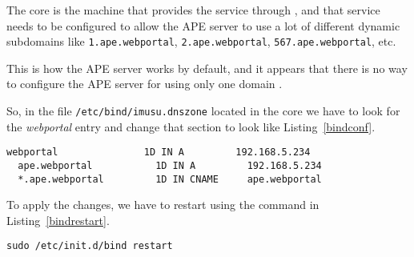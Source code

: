 The  core is the machine that provides the  service through , and that service needs to be configured to allow the \ac{APE} server to use a lot of different dynamic subdomains like \verb|1.ape.webportal|, \verb|2.ape.webportal|, \verb|567.ape.webportal|, etc.

This is how the \ac{APE} server works by default, and it appears that there is no way to configure the \ac{APE} server for using only one domain \cite{ApeConfig}.

So, in the file \verb|/etc/bind/imusu.dnszone| located in the  core
we have to look for the \emph{webportal} entry and change that section to look
like Listing~\vref{bindconf}.

\begin{lstlisting}[label=bindconf,caption=BIND configuration]
  webportal               1D IN A         192.168.5.234
  ape.webportal           1D IN A         192.168.5.234
  *.ape.webportal         1D IN CNAME     ape.webportal
\end{lstlisting}

To apply the changes, we have to restart  using the command in
Listing~\vref{bindrestart}.

\begin{lstlisting}[label=bindrestart,caption=BIND restart command]
  sudo /etc/init.d/bind restart
\end{lstlisting}
